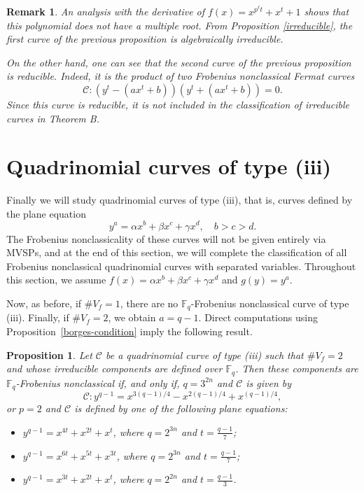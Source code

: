 \documentclass[preprint,12pt]{elsarticle}
\newtheorem{proposition}[theorem]{Proposition}
\newtheorem{remark}[theorem]{Remark}
\begin{document}
\begin{remark}
    An analysis with the derivative of $f(x) = x^{p^{\ell}t} + x^t + 1$ shows that this polynomial does not have a multiple root. From Proposition \ref{irreducible}, the first curve of the previous proposition is algebraically irreducible.
    
    On the other hand, one can see that the second curve of the previous proposition is reducible. Indeed, it is the product of two Frobenius nonclassical Fermat curves
    $$\mathcal{C}: (y^t - (ax^t + b))(y^t + (ax^t + b)) = 0.$$ Since this curve is reducible, it is not included in the classification of irreducible curves in Theorem B.
\end{remark}

\section{Quadrinomial curves of type (iii)}\label{section:quadrinomial3}

Finally we will study quadrinomial curves of type (iii), that is, curves defined by the plane equation
$$
y^a = \alpha x^b + \beta x^c + \gamma x^d, \quad b > c > d.
$$
The Frobenius nonclassicality of these curves will not be given entirely via MVSPs, and at the end of this section, we will complete the classification of all Frobenius nonclassical quadrinomial curves with separated variables. Throughout this section, we assume $f(x) = \alpha x^{b} + \beta x^c + \gamma x^d$ and $g(y) = y^a$.

Now, as before, if $\# V_f = 1$, there are no $\mathbb{F}_q$-Frobenius nonclassical curve of type (iii). Finally, if $\# V_f = 2$, we obtain $a = q - 1$. Direct computations using Proposition~\ref{borges-condition} imply the following result.

\begin{proposition}
Let $\mathcal{C}$ be a quadrinomial curve of type (iii) such that $\# V_f = 2$ and whose irreducible components are defined over $\mathbb{F}_q$. Then these components are $\mathbb{F}_q$-Frobenius nonclassical if, and only if, $q = 3^{2n}$ and $\mathcal{C}$ is given by
$$\mathcal{C}: y^{q-1} = x^{3(q-1)/4} - x^{2(q-1)/4} + x^{(q-1)/4},$$
or $p = 2$ and $\mathcal{C}$ is defined by one of the following plane equations:
\begin{itemize}
    \item[(i)] $y^{q-1} = x^{4t} + x^{2t} + x^t$, where $q = 2^{3n}$ and $t = \frac{q - 1}{7}$;
    
    \item[(ii)] $y^{q-1} = x^{6t} +  x^{5t} + x^{3t}$, where $q = 2^{3n}$ and $t = \frac{q - 1}{7}$;
    
    \item[(iii)] $y^{q-1} = x^{3t} + x^{2t} + x^t$, where $q = 2^{2n}$ and $t = \frac{q - 1}{3}$.
\end{itemize}
\end{proposition}
\end{document}
